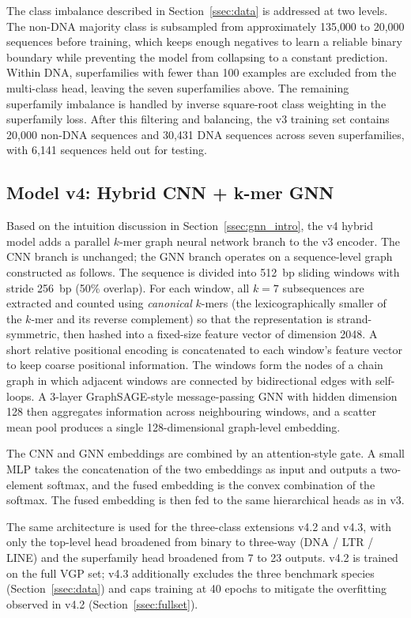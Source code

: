 \documentclass[12pt]{article}
\begin{document}
The class imbalance described in Section~\ref{ssec:data} is addressed at two levels. The non-DNA majority class is subsampled from approximately 135{,}000 to 20{,}000 sequences before training, which keeps enough negatives to learn a reliable binary boundary while preventing the model from collapsing to a constant prediction. Within DNA, superfamilies with fewer than 100 examples are excluded from the multi-class head, leaving the seven superfamilies above. The remaining superfamily imbalance is handled by inverse square-root class weighting in the superfamily loss. After this filtering and balancing, the v3 training set contains 20{,}000 non-DNA sequences and 30{,}431 DNA sequences across seven superfamilies, with 6{,}141 sequences held out for testing.

\subsection{Model v4: Hybrid CNN + k-mer GNN}\label{ssec:methods_v4}

Based on the intuition discussion in Section~\ref{ssec:gnn_intro}, the v4 hybrid model adds a parallel $k$-mer graph neural network branch to the v3 encoder. The CNN branch is unchanged; the GNN branch operates on a sequence-level graph constructed as follows. The sequence is divided into 512~bp sliding windows with stride 256~bp (50\% overlap). For each window, all $k=7$ subsequences are extracted and counted using \emph{canonical} $k$-mers (the lexicographically smaller of the $k$-mer and its reverse complement) so that the representation is strand-symmetric, then hashed into a fixed-size feature vector of dimension 2048. A short relative positional encoding is concatenated to each window's feature vector to keep coarse positional information. The windows form the nodes of a chain graph in which adjacent windows are connected by bidirectional edges with self-loops. A 3-layer GraphSAGE-style \cite{hamilton2017inductive} message-passing GNN with hidden dimension 128 then aggregates information across neighbouring windows, and a scatter mean pool produces a single 128-dimensional graph-level embedding.

The CNN and GNN embeddings are combined by an attention-style gate. A small MLP takes the concatenation of the two embeddings as input and outputs a two-element softmax, and the fused embedding is the convex combination of the softmax. The fused embedding is then fed to the same hierarchical heads as in v3. 

The same architecture is used for the three-class extensions v4.2 and v4.3, with only the top-level head broadened from binary to three-way (DNA / LTR / LINE) and the superfamily head broadened from 7 to 23 outputs. v4.2 is trained on the full VGP set; v4.3 additionally excludes the three benchmark species (Section~\ref{ssec:data}) and caps training at 40 epochs to mitigate the overfitting observed in v4.2 (Section~\ref{ssec:fullset}).
\end{document}
